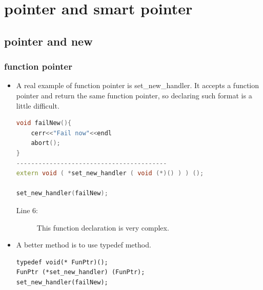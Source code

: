 \documentclass[a4paper,11pt,twoside]{book}
\begin{document}
\chapter{pointer and smart pointer}

\section{pointer and new}
\subsection{function pointer}
\begin{itemize}  

\item A real example of function pointer is set\_new\_handler. It accepts a function pointer and return the same function pointer, so declaring such format is a little difficult.
\begin{lstlisting}[frame=single, language=c++]
void failNew(){
	cerr<<"Fail now"<<endl
	abort();
}
-----------------------------------------
extern void ( *set_new_handler ( void (*)() ) ) ();

set_new_handler(failNew);
\end{lstlisting}
\begin{description}
	\item[Line 6:] This function declaration is very complex. 
\end{description}

\item A better method is to use typedef method.

\begin{lstlisting}[numbers = none]
typedef void(* FunPtr)();
FunPtr (*set_new_handler) (FunPtr);
set_new_handler(failNew);
\end{lstlisting}

\end{itemize}
\end{document}
